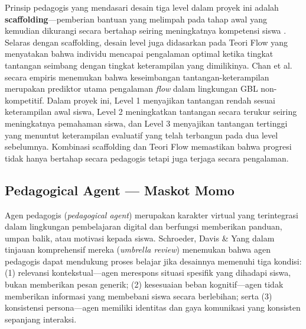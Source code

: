 \documentclass[12pt,a4paper,oneside,openany]{report}
\begin{document}
Prinsip pedagogis yang mendasari desain tiga level dalam proyek ini adalah \textbf{scaffolding}---pemberian bantuan yang melimpah pada tahap awal yang kemudian dikurangi secara bertahap seiring meningkatnya kompetensi siswa \cite{ref6}. Selaras dengan scaffolding, desain level juga didasarkan pada Teori Flow yang menyatakan bahwa individu mencapai pengalaman optimal ketika tingkat tantangan seimbang dengan tingkat keterampilan yang dimilikinya. Chan et al. \cite{ref7} secara empiris menemukan bahwa keseimbangan tantangan-keterampilan merupakan prediktor utama pengalaman \textit{flow} dalam lingkungan GBL non-kompetitif. Dalam proyek ini, Level 1 menyajikan tantangan rendah sesuai keterampilan awal siswa, Level 2 meningkatkan tantangan secara terukur seiring meningkatnya pemahaman siswa, dan Level 3 menyajikan tantangan tertinggi yang menuntut keterampilan evaluatif yang telah terbangun pada dua level sebelumnya. Kombinasi scaffolding dan Teori Flow memastikan bahwa progresi tidak hanya bertahap secara pedagogis tetapi juga terjaga secara pengalaman.

\subsection{Pedagogical Agent --- Maskot Momo}
\label{subsec:pedagogical-agent}

Agen pedagogis (\textit{pedagogical agent}) merupakan karakter virtual yang terintegrasi dalam lingkungan pembelajaran digital dan berfungsi memberikan panduan, umpan balik, atau motivasi kepada siswa. Schroeder, Davis \& Yang \cite{ref9} dalam tinjauan komprehensif mereka (\textit{umbrella review}) menemukan bahwa agen pedagogis dapat mendukung proses belajar jika desainnya memenuhi tiga kondisi: (1) relevansi kontekstual---agen merespons situasi spesifik yang dihadapi siswa, bukan memberikan pesan generik; (2) kesesuaian beban kognitif---agen tidak memberikan informasi yang membebani siswa secara berlebihan; serta (3) konsistensi persona---agen memiliki identitas dan gaya komunikasi yang konsisten sepanjang interaksi.
\end{document}
